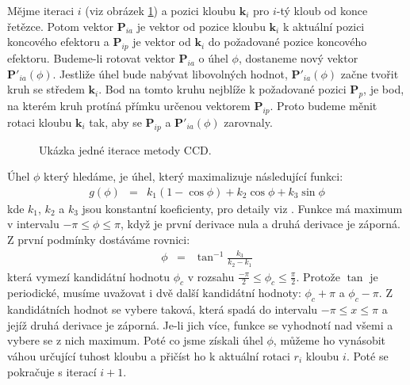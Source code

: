 Mějme iteraci $i$ (viz obrázek \ref{ccd_img}) a pozici kloubu $\mathbf{k}_i$ pro $i$-tý kloub od konce řetězce. Potom vektor $\mathbf{P}_{ia}$ je vektor od pozice kloubu $\mathbf{k}_i$ k aktuální pozici koncového efektoru a $\mathbf{P}_{ip}$ je vektor od $\mathbf{k}_i$ do požadované pozice koncového efektoru. Budeme-li rotovat vektor $\mathbf{P}_{ia}$ o úhel $\phi$, dostaneme nový vektor $\mathbf{P}'_{ia}(\phi)$. Jestliže úhel bude nabývat libovolných hodnot, $\mathbf{P}'_{ia}(\phi)$ začne tvořit kruh se středem $\mathbf{k}_i$. Bod na tomto kruhu nejblíže k požadované pozici $\mathbf{P}_p$, je bod, na kterém kruh protíná přímku určenou vektorem $\mathbf{P}_{ip}$. Proto budeme měnit rotaci kloubu $\mathbf{k}_i$ tak, aby se $\mathbf{P}_{ip}$ a $\mathbf{P}'_{ia}(\phi)$ zarovnaly.
\begin{figure}[h]
\begin{center}
\caption{Ukázka jedné iterace metody CCD.} \label{ccd_img}
\end{center}
\end{figure}
Úhel $\phi$ který hledáme, je úhel, který maximalizuje následující funkci:
\begin{eqnarray}
g(\phi) &=& k_1(1 - \cos\phi) + k_2 \cos\phi + k_3 \sin\phi\label{r.ccd_max1}
\end{eqnarray}
kde $k_1$, $k_2$ a $k_3$ jsou konstantní koeficienty, pro detaily viz \cite{welman}. Funkce má maximum v intervalu $-\pi \leq \phi \leq \pi$, když je první derivace nula a druhá derivace je záporná. Z první podmínky dostáváme rovnici:
\begin{eqnarray}
\phi &=& \tan^{-1}\frac{k_3}{k_2 - k_1}\label{r.ccd_max2}
\end{eqnarray}
která vymezí kandidátní hodnotu $\phi_c$ v rozsahu $\frac{-\pi}{2} \leq \phi_c \leq \frac{\pi}{2}$. Protože $\tan$ je periodické, musíme uvažovat i dvě další kandidátní hodnoty: $\phi_c + \pi$ a $\phi_c - \pi$. Z kandidátních hodnot se vybere taková, která spadá do intervalu $-\pi \leq x \leq \pi$ a jejíž druhá derivace je záporná. Je-li jich více, funkce se vyhodnotí nad všemi a vybere se z nich maximum. Poté co jsme získali úhel $\phi$, můžeme ho vynásobit váhou určující tuhost kloubu a přičíst ho k aktuální rotaci $r_i$ kloubu $i$. Poté se pokračuje s iterací $i+1$.
